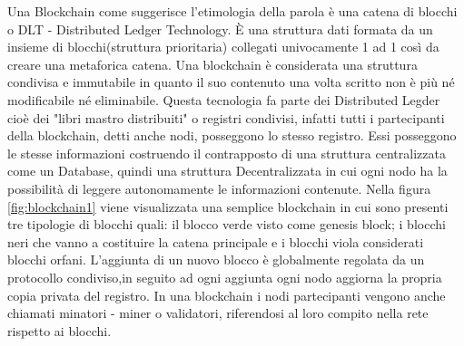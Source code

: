 \documentclass[11pt,a4paper,titlepage, twoside, openright]{report}
\begin{document}
Una Blockchain come suggerisce l'etimologia della parola è una catena di blocchi o DLT - Distributed Ledger Technology. È una struttura dati formata da un insieme di blocchi(struttura prioritaria) collegati univocamente 1 ad 1 così da creare una metaforica catena. Una blockchain è considerata una struttura condivisa e immutabile in quanto il suo contenuto una volta scritto non è più né modificabile né eliminabile. Questa tecnologia fa parte dei Distributed Legder cioè dei "libri mastro distribuiti" o registri condivisi, infatti tutti i partecipanti della blockchain, detti anche nodi, posseggono lo stesso registro. Essi posseggono le stesse informazioni costruendo il contrapposto di una struttura centralizzata come un Database, quindi una struttura Decentralizzata in cui ogni nodo ha la possibilità di leggere autonomamente le informazioni contenute.
Nella figura \ref{fig:blockchain1} viene visualizzata una semplice blockchain in cui sono presenti tre tipologie di blocchi quali: il blocco verde visto come genesis block; i blocchi neri che vanno a costituire la catena principale e i blocchi viola considerati blocchi orfani. L'aggiunta di un nuovo blocco è globalmente regolata da un protocollo condiviso,in seguito ad ogni aggiunta ogni nodo aggiorna la propria copia privata del registro. In una blockchain i nodi partecipanti vengono anche chiamati minatori - miner o validatori, riferendosi al loro compito nella rete rispetto ai blocchi.
\end{document}

